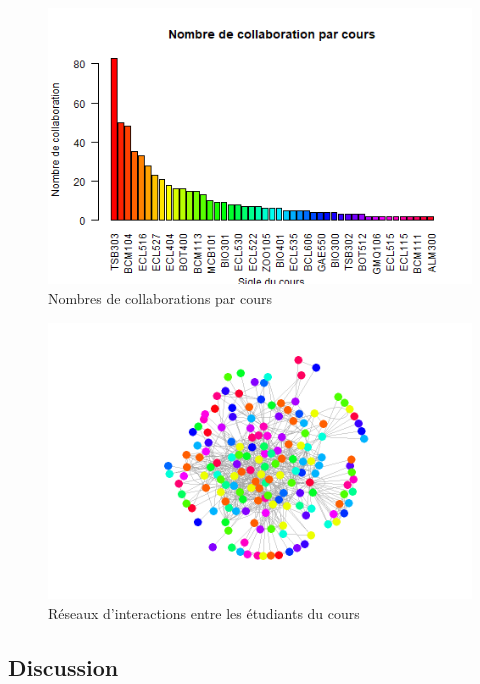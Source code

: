 \documentclass[9pt,twocolumn,twoside,]{pnas-new}
\begin{document}
\begin{figure}
  \centering
  \includegraphics[width=\linewidth]{sigle3.png}
  \caption{Nombres de collaborations par cours}
  \label{fig:sigle3}
\end{figure}

\begin{figure}
  \centering
  \includegraphics[width=\linewidth]{matrice.png}
  \caption{Réseaux d'interactions entre les étudiants du cours}
  \label{fig:matrice}
\end{figure}

\hypertarget{Discussion}{%
\subsection*{Discussion}\label{Discussion}}
\end{document}
